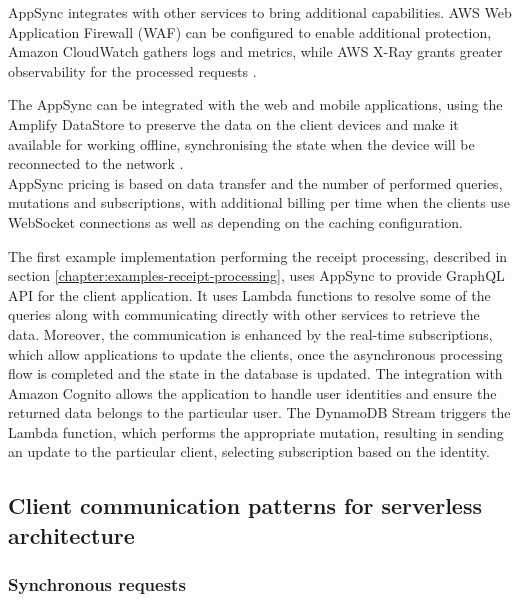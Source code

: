 AppSync integrates with other services to bring additional capabilities.
AWS Web Application Firewall (WAF) can be configured to enable additional protection, Amazon CloudWatch gathers logs and metrics, while AWS X-Ray grants greater observability for the processed requests \cite{DevelopServerlessGraphQLArchitecturesUsingAWSAppSync}.

The AppSync can be integrated with the web and mobile applications, using the Amplify DataStore to preserve the data on the client devices and make it available for working offline, synchronising the state when the device will be reconnected to the network \cite{AppSyncFeatures}. \\

AppSync pricing is based on data transfer and the number of performed queries, mutations and subscriptions, with additional billing per time when the clients use WebSocket connections as well as depending on the caching configuration.

The first example implementation performing the receipt processing, described in section \ref{chapter:examples-receipt-processing}, uses AppSync to provide GraphQL API for the client application. It uses Lambda functions to resolve some of the queries along with communicating directly with other services to retrieve the data.
Moreover, the communication is enhanced by the real-time subscriptions, which allow applications to update the clients, once the asynchronous processing flow is completed and the state in the database is updated.
The integration with Amazon Cognito allows the application to handle user identities and ensure the returned data belongs to the particular user.
The DynamoDB Stream triggers the Lambda function, which performs the appropriate mutation, resulting in sending an update to the particular client, selecting subscription based on the identity.

\subsection{Client communication patterns for serverless architecture}


\subsubsection{Synchronous requests}

